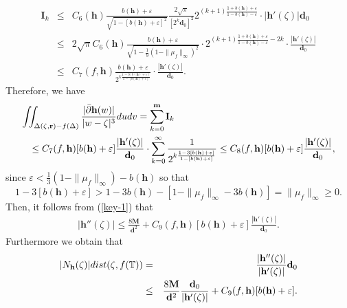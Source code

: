 \documentclass[11pt]{amsart}
\theoremstyle{remark}
\theoremstyle{claim}
\theoremstyle{definition}
\theoremstyle{problem}
\theoremstyle{conjecture}
\theoremstyle{question}
\numberwithin{equation}{section}
\begin{document}
\begin{eqnarray}\label{xiugai-1}
\mathbf{I}_k & \leq & C_6(\mathbf{h}) \frac{b(\mathbf{h})+\varepsilon}{\sqrt{1-[b(\mathbf{h})+\varepsilon]^2}}\frac{2\sqrt{\pi}}{[2^k\mathbf{d}_0]^2} 2^{(k+1) \frac{1+b(\mathbf{h})+\varepsilon}{1-b(\mathbf{h})-\varepsilon}}\cdot |{\mathbf{h}}'(\zeta)|\mathbf{d}_0\nonumber \\
&\leq & 2\sqrt{\pi} C_6(\mathbf{h}) \frac{b(\mathbf{h})+\varepsilon}{\sqrt{1-\frac{1}{9}(1-\|\mu_f\|_{\infty})^2}}\cdot  2^{(k+1) \frac{1+b(\mathbf{h})+\varepsilon}{1-b(\mathbf{h})-\varepsilon}-2k}
\cdot \frac{|{\mathbf{h}}'(\zeta)|}{\mathbf{d}_0}\nonumber \\
&\leq & C_7(f, \mathbf{h}) \frac{b(\mathbf{h})+\varepsilon}{2^{k\frac{1-3[b(\mathbf{h})+\varepsilon]}{1-[b(\mathbf{h})+\varepsilon]}}}\cdot \frac{|{\mathbf{h}}'(\zeta)|}{\mathbf{d}_0}. \nonumber
\end{eqnarray}
Therefore, we have
\begin{eqnarray}
\lefteqn{\iint_{\Delta(\zeta, \mathbf{r})-f(\Delta)}\frac{|\bar{\partial} \mathbf{h}(w)|}{|w-\zeta|^3}dudv=\sum_{k=0}^{{\mathbf{m}}} \mathbf{I}_k} \nonumber  \\
 &&\leq C_7(f, \mathbf{h})[b(\mathbf{h})+\varepsilon] \frac{|\mathbf{h}'(\zeta)|}{\mathbf{d}_0}\cdot   \sum_{k=0}^{\infty} \frac{1}{2^{k\frac{1-3[b(\mathbf{h})+\varepsilon]}{1-[b(\mathbf{h})+\varepsilon]}}}\leq  C_{8}(f, \mathbf{h})[b(\mathbf{h})+\varepsilon] \frac{|{\mathbf{h}}'(\zeta)|}{\mathbf{d}_0}, \nonumber
\end{eqnarray}
since $\varepsilon< \frac{1}{3}(1-\|\mu_f\|_{\infty})-b(\mathbf{h})$ so that $$1-3[b(\mathbf{h})+\varepsilon]>1-3b(\mathbf{h})-[1-\|\mu_f\|_{\infty}-3b(\mathbf{h})]=\|\mu_f\|_{\infty}\geq 0.$$
Then, it follows from (\ref{key-1}) that
\begin{eqnarray}\label{key-2}|{\mathbf{h}}''(\zeta)| \leq  \frac{8\mathbf{M}}{{\mathbf{d}}^2}+C_{9}(f, \mathbf{h})[b(\mathbf{h})+\varepsilon]\frac{|{\mathbf{h}}'(\zeta)|}{\mathbf{d}_0}. \nonumber
\end{eqnarray}
Furthermore we obtain that
\begin{eqnarray}\label{int-l}
|N_{\mathbf{h}}(\zeta)|{\textup{dist}}(\zeta, f(\mathbb{T}))&=&\frac{|{\mathbf{h}}''(\zeta)|}{|\mathbf{h}'(\zeta)|}\mathbf{d}_0 \\
& \leq &  \frac{8\mathbf{M}}{{\mathbf{d}}^2}\frac{\mathbf{d}_0}{|\mathbf{h}'(\zeta)|}+C_{9}(f, \mathbf{h})[b(\mathbf{h})+\varepsilon]. \nonumber
\end{eqnarray}
\end{document}
